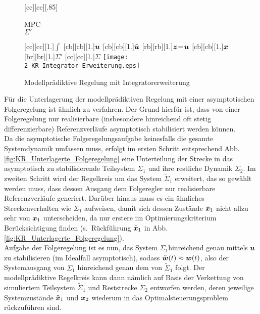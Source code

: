 \begin{figure}[h]
\centering
\newcommand{\smallsize}{.85}
	[cc][cc][\smallsize]{\parbox[c]{7cm}{\begin{center}MPC\\ $\Sigma'$ \end{center}}}
		[cc][cc][1.]{$\int$}
		[cb][cb][1.]{$\boldsymbol{u}$}
		[cb][cb][1.]{$\tilde{\boldsymbol{u}}$}
		[rb][rb][1.]{$\boldsymbol{z}\!=\!\boldsymbol{u}$}
		[cb][cb][1.]{$\boldsymbol{x}$}
		[br][br][1.]{$\Sigma'$}
		[cc][cc][1.]{$\Sigma$}
	\texttt{[image: 2\_KR\_Integrator\_Erweiterung.eps]}
	\caption{Modellprädiktive Regelung mit Integratorerweiterung}
	\label{fig:KR_Integrator_Erweiterung}
\end{figure}

Für die Unterlagerung der modellprädiktiven Regelung mit einer asymptotischen Folgeregelung ist ähnlich zu verfahren. Der Grund hierfür ist, dass von einer Folgeregelung nur realisierbare (insbesondere hinreichend oft stetig differenzierbare) Referenzverläufe asymptotisch stabilisiert werden können. \\
Da die asymptotische Folgeregelungsaufgabe keinesfalls die gesamte Systemdynamik umfassen muss, erfolgt im ersten Schritt entsprechend Abb.\,\ref{fig:KR_Unterlagerte_Folgeregelung} eine Unterteilung der Strecke in das asymptotisch zu stabilisierende Teilsystem $\Sigma_1$ und ihre restliche Dynamik $\Sigma_2$. Im zweiten Schritt wird der Regelkreis um das System $\tilde \Sigma_1$ erweitert, das so gewählt werden muss, dass dessen Ausgang dem Folgeregler nur realisierbare Referenzverläufe generiert. Darüber hinaus muss es ein ähnliches Streckenverhalten wie $\Sigma_1$ aufweisen, damit sich dessen Zustände $\tilde {\boldsymbol{x}}_1$ nicht allzu sehr von $\boldsymbol{x}_1$ unterscheiden, da nur erstere im Optimierungskriterium Berücksichtigung finden (s.\ Rückführung $\tilde {\boldsymbol{x}}_1$ in Abb.\,\ref{fig:KR_Unterlagerte_Folgeregelung}). \\
Aufgabe der Folgeregelung ist es nun, das System $\Sigma_1$hinreichend genau mittels $\boldsymbol{u}$ zu stabilisieren (im Idealfall asymptotisch), sodass $\tilde {\boldsymbol{w}}(t) \approx \boldsymbol{w}(t)$, also der Systemausgang von $\Sigma_1$ hinreichend genau dem von $\tilde\Sigma_1$ folgt. Der modellprädiktive Regelkreis kann dann nämlich auf Basis der Verkettung von simuliertem Teilsystem $\tilde \Sigma_1$ und Reststrecke $\Sigma_2$ entworfen werden, deren jeweilige Systemzustände $\tilde {\boldsymbol{x}}_1$ und $\boldsymbol{x}_2$ wiederum in das Optimalsteuerungsproblem rückzuführen sind. \\
